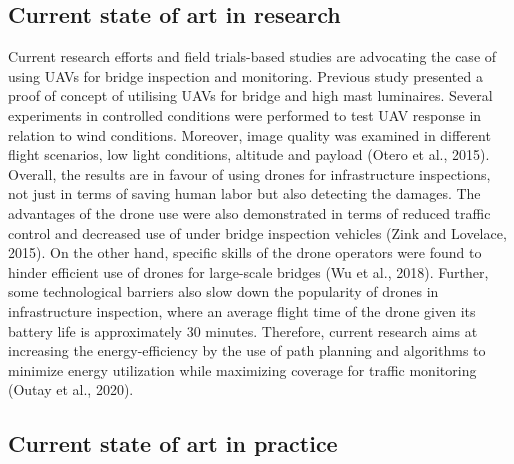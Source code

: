 \documentclass[
]{book}
\begin{document}
\hypertarget{current-state-of-art-in-research-3}{%
\subsection*{Current state of art in research}\label{current-state-of-art-in-research-3}}

Current research efforts and field trials-based studies are advocating the case of using UAVs for bridge inspection and monitoring. Previous study presented a proof of concept of utilising UAVs for bridge and high mast luminaires. Several experiments in controlled conditions were performed to test UAV response in relation to wind conditions. Moreover, image quality was examined in different flight scenarios, low light conditions, altitude and payload (Otero et al., 2015). Overall, the results are in favour of using drones for infrastructure inspections, not just in terms of saving human labor but also detecting the damages. The advantages of the drone use were also demonstrated in terms of reduced traffic control and decreased use of under bridge inspection vehicles (Zink and Lovelace, 2015). On the other hand, specific skills of the drone operators were found to hinder efficient use of drones for large-scale bridges (Wu et al., 2018). Further, some technological barriers also slow down the popularity of drones in infrastructure inspection, where an average flight time of the drone given its battery life is approximately 30 minutes. Therefore, current research aims at increasing the energy-efficiency by the use of path planning and algorithms to minimize energy utilization while maximizing coverage for traffic monitoring (Outay et al., 2020).

\hypertarget{current-state-of-art-in-practice-3}{%
\subsection*{Current state of art in practice}\label{current-state-of-art-in-practice-3}}
\end{document}
